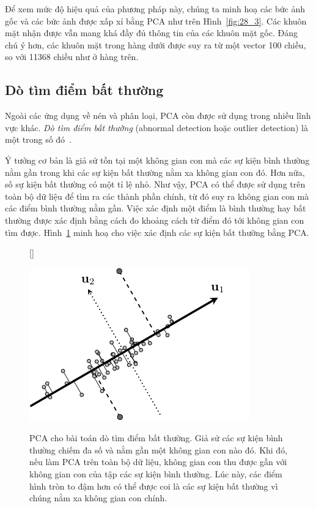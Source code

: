 Để xem mức độ hiệu quả của phương pháp này, chúng ta  minh hoạ các bức ảnh gốc và các bức ảnh được xấp xỉ bằng PCA như trên
Hình~\ref{fig:28_3}. Các khuôn mặt nhận được vẫn mang khá đầy đủ thông tin của
các khuôn mặt gốc. Đáng chú ý hơn, các khuôn mặt trong hàng dưới được suy ra
từ một vector 100 chiều, so với 11368 chiều như ở hàng trên.





\subsection{Dò tìm điểm bất thường}
Ngoài các ứng dụng về nén và phân loại, PCA còn được sử dụng trong nhiều lĩnh
vực khác. \textit{Dò tìm điểm bất thường} (abnormal detection hoặc {outlier
    detection}) là một trong số đó~\cite{shyu2003novel,lakhina2004diagnosing}.

Ý tưởng cơ bản là giả sử tồn tại một không gian con mà các sự kiện bình thường
nằm gần trong khi các sự kiện bất thường nằm xa không gian con đó. Hơn nữa, số
sự kiện bất thường có một tỉ lệ nhỏ. Như vậy, PCA có thể được sử dụng trên toàn
bộ dữ liệu để tìm ra các thành phần chính, từ đó suy ra không gian con mà các điểm bình thường nằm gần.
Việc xác định một điểm là bình thường hay bất thường được xác định bằng cách đo
khoảng cách từ điểm đó tới không gian con tìm được. Hình~\ref{fig:28_4} minh hoạ
cho việc xác định các sự kiện bất thường bằng PCA.

\begin{figure}[t]

    [\FBwidth]
    {\caption{ PCA cho bài toán dò tìm điểm bất thường. Giả sử
    các sự kiện {bình thường} chiếm đa số và nằm gần  một không
    gian con nào đó. Khi đó, nếu làm PCA trên toàn bộ dữ liệu, không gian con
    thu được gần với không gian con của tập các sự kiện {bình thường}.
    Lúc này, các
    điểm hình tròn to đậm hơn có thể được coi là các sự kiện {bất thường} vì chúng nằm xa không gian con chính.}
    \label{fig:28_4}}
    { %
    \includegraphics[width=.45\textwidth]{Chapters/07_DimemsionalityReduction/28_pca2/latex/abnormal.pdf}
    }
\end{figure}


